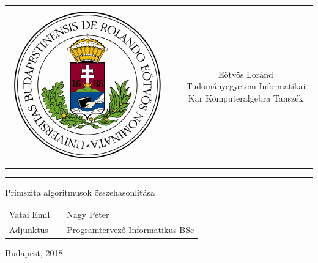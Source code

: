 \documentclass[12pt]{report}
\begin{document}
\begin{titlepage}
\vspace*{0cm}
\centering
\begin{tabular}{cp{2cm}c}
\begin{minipage}{4cm}
\vspace{0pt}
\includegraphics[width=1\textwidth]{eltecimerszines}
\end{minipage} & &
\begin{minipage}{7cm}
\vspace{0pt}Eötvös Loránd Tudományegyetem \vspace{10pt} \newline
Informatikai Kar \vspace{10pt} \newline
Komputeralgebra Tanszék
\end{minipage}
\end{tabular}

\vspace*{0.2cm}
\rule{\textwidth}{1pt}

\vspace*{6cm}
{\Huge Prímszita algoritmusok összehasonlítása}

\vspace*{5cm}
\begin{tabular}{lp{3cm}l}
Vatai Emil & & Nagy Péter\\
Adjunktus & & Programtervező Informatikus BSc
\end{tabular}

\vfill

\vspace*{1cm}
Budapest, 2018
\end{titlepage}
\end{document}
